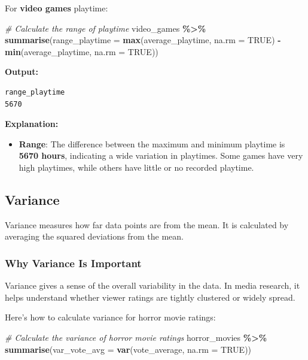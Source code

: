 \documentclass[
]{book}
\newenvironment{Shaded}{\begin{snugshade}}{\end{snugshade}}
\newcommand{\AttributeTok}[1]{\textcolor[rgb]{0.13,0.29,0.53}{#1}}
\newcommand{\CommentTok}[1]{\textcolor[rgb]{0.56,0.35,0.01}{\textit{#1}}}
\newcommand{\ConstantTok}[1]{\textcolor[rgb]{0.56,0.35,0.01}{#1}}
\newcommand{\FunctionTok}[1]{\textcolor[rgb]{0.13,0.29,0.53}{\textbf{#1}}}
\newcommand{\NormalTok}[1]{#1}
\newcommand{\SpecialCharTok}[1]{\textcolor[rgb]{0.81,0.36,0.00}{\textbf{#1}}}
\providecommand{\tightlist}{%
  \setlength{\itemsep}{0pt}\setlength{\parskip}{0pt}}
\begin{document}
For \textbf{video games} playtime:

\begin{Shaded}
\begin{Highlighting}[]
\CommentTok{\# Calculate the range of playtime}
\NormalTok{video\_games }\SpecialCharTok{\%\textgreater{}\%}
  \FunctionTok{summarise}\NormalTok{(}\AttributeTok{range\_playtime =} \FunctionTok{max}\NormalTok{(average\_playtime, }\AttributeTok{na.rm =} \ConstantTok{TRUE}\NormalTok{) }\SpecialCharTok{{-}} \FunctionTok{min}\NormalTok{(average\_playtime, }\AttributeTok{na.rm =} \ConstantTok{TRUE}\NormalTok{))}
\end{Highlighting}
\end{Shaded}

\textbf{Output:}

\begin{verbatim}
range_playtime
5670
\end{verbatim}

\textbf{Explanation:}

\begin{itemize}
\tightlist
\item
  \textbf{Range}: The difference between the maximum and minimum playtime is \textbf{5670 hours}, indicating a wide variation in playtimes. Some games have very high playtimes, while others have little or no recorded playtime.
\end{itemize}

\subsection*{Variance}\label{variance}

Variance measures how far data points are from the mean. It is calculated by averaging the squared deviations from the mean.

\subsubsection*{Why Variance Is Important}\label{why-variance-is-important}

Variance gives a sense of the overall variability in the data. In media research, it helps understand whether viewer ratings are tightly clustered or widely spread.

Here's how to calculate variance for horror movie ratings:

\begin{Shaded}
\begin{Highlighting}[]
\CommentTok{\# Calculate the variance of horror movie ratings}
\NormalTok{horror\_movies }\SpecialCharTok{\%\textgreater{}\%}
  \FunctionTok{summarise}\NormalTok{(}\AttributeTok{var\_vote\_avg =} \FunctionTok{var}\NormalTok{(vote\_average, }\AttributeTok{na.rm =} \ConstantTok{TRUE}\NormalTok{))}
\end{Highlighting}
\end{Shaded}
\end{document}
